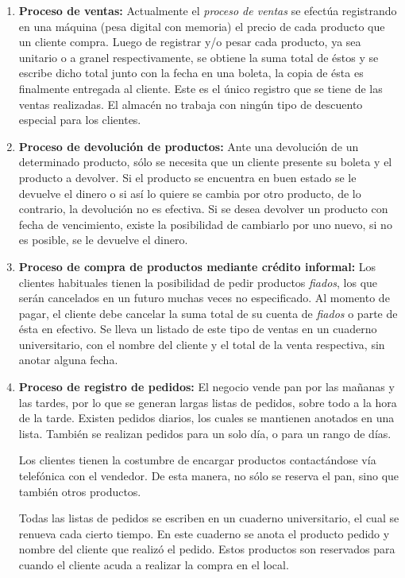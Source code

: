 \documentclass[letterpaper,12pt]{article}
\begin{document}
\begin{enumerate}
\item \textbf{Proceso de ventas:} 
Actualmente el \emph{proceso de ventas} se efectúa registrando en una máquina (pesa digital con memoria) el 
precio de cada producto que un cliente compra. Luego de registrar y/o pesar cada producto, ya sea 
unitario o a granel respectivamente, se obtiene la suma total de éstos y se escribe dicho total junto 
con la fecha en una boleta, la copia de ésta es finalmente entregada al cliente. Este es el único registro que
se tiene de las ventas realizadas. El almacén no trabaja con ningún tipo de descuento especial para los clientes.

\item \textbf{Proceso de devolución de productos:}
Ante una devolución de un determinado producto, sólo se necesita que un cliente presente su boleta y
el producto a devolver. Si el producto se encuentra en buen estado se le devuelve el dinero o si así lo quiere 
se cambia por otro producto, de lo contrario, la devolución no es efectiva. Si se desea devolver 
un producto con fecha de vencimiento, existe la posibilidad de cambiarlo por uno nuevo, si no es posible, se le 
devuelve el dinero.

\item \textbf{Proceso de compra de productos mediante crédito informal:}
Los clientes habituales tienen la posibilidad de pedir productos \emph{fiados}, los que serán 
cancelados en un futuro muchas veces no especificado. Al momento de pagar, el cliente debe
cancelar la suma total de su cuenta de \emph{fiados} o parte de ésta en efectivo. Se lleva
un listado de este tipo de ventas en un cuaderno universitario, con el nombre del cliente y el 
total de la venta respectiva, sin anotar alguna fecha.

\newpage

\item \textbf{Proceso de registro de pedidos:}
El negocio vende pan por las mañanas y las tardes, por lo que se generan largas listas de 
pedidos, sobre todo a la hora de la tarde. Existen pedidos diarios, los cuales se mantienen 
anotados en una lista. También se realizan pedidos para un solo día, o para un rango de días.

Los clientes tienen la costumbre de encargar productos contactándose vía telefónica con el 
vendedor. De esta manera, no sólo se reserva el pan, sino que también otros productos.

Todas las listas de pedidos se escriben en un cuaderno universitario, el cual se renueva cada
cierto tiempo. En este cuaderno se anota el producto pedido y nombre del cliente que realizó el 
pedido. Estos productos son reservados para cuando el cliente acuda a realizar la compra en el local. 


\end{enumerate}
\end{document}
